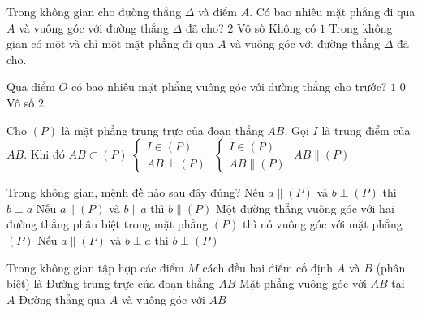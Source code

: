 \begin{ex}%
	Trong không gian cho đường thẳng $\Delta$ và điểm $A$. Có bao nhiêu mặt phẳng đi qua $A$ và vuông góc với đường thẳng $\Delta$ đã cho?
	\choice
	{$2$}
	{Vô số}
	{Không có}
	{\True $1$}
	\loigiai
	{
		Trong không gian có một và chỉ một mặt phẳng đi qua $A$ và vuông góc với đường thẳng $\Delta$ đã cho.
	}
\end{ex}
\begin{ex}%
	Qua điểm $O$ có bao nhiêu mặt phẳng vuông góc với đường thẳng cho trước?
	\choice
	{\True $1$}
	{$0$}
	{Vô số}
	{$2$}
\end{ex}
\begin{ex}%
	Cho $\left( P \right)$ là mặt phẳng trung trực của đoạn thẳng $AB$. Gọi $I$ là trung điểm của $AB$. Khi đó
	\choice
	{$AB \subset \left( P \right)$}
	{\True $
		\begin{cases} I \in \left( P \right) \\ AB \perp \left( P \right) \end{cases}$}
	{$
		\begin{cases} I \in \left( P \right) \\ AB \parallel \left( P \right) \end{cases}$}
	{$AB\parallel \left( P \right)$}
\end{ex}
\begin{ex}%
	Trong không gian, mệnh đề nào sau đây đúng?
	\choice
	{\True Nếu $a\parallel (P)$ và $b\perp (P)$ thì $b\perp a$}
	{Nếu $a\parallel (P)$ và $b\parallel a$ thì $b\parallel (P)$}
	{Một đường thẳng vuông góc với hai đường thẳng phân biệt trong mặt phẳng $(P)$ thì nó vuông góc với mặt phẳng $(P)$}
	{Nếu $a\parallel (P)$ và $b\perp a$ thì $b\perp (P)$}
\end{ex}
\begin{ex}%
	Trong không gian tập hợp các điểm $M$ cách đều hai điểm cố định $A$ và $B$ (phân biệt) là
	{Đường trung trực của đoạn thẳng $AB$}
	{Mặt phẳng vuông góc với $AB$ tại $A$}
	{Đường thẳng qua $A$ và vuông góc với $AB$}
\end{ex}
